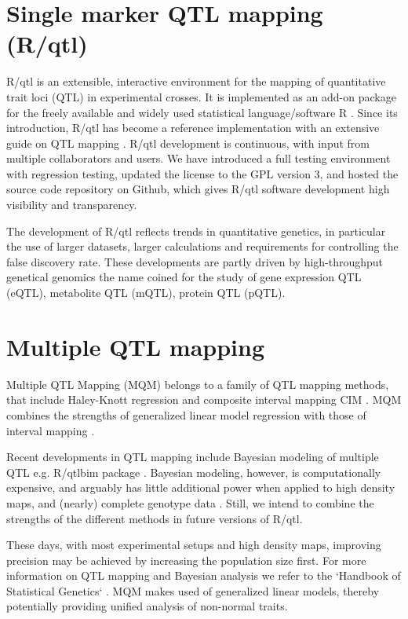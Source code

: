 \section{Single marker QTL mapping (R/qtl)}
R/qtl is an extensible, interactive environment for the mapping of quantitative trait loci (QTL) 
in experimental crosses. It is implemented as an add-on package for the freely available and 
widely used statistical language/software R \cite{R:2009}. Since its introduction, R/qtl 
\cite{Broman:2003} has become a reference implementation with an extensive guide on QTL mapping 
\cite{RQTLGuide:2009}. R/qtl development is continuous, with input from multiple collaborators 
and users.  We have introduced a full testing environment with regression testing, updated the 
license to the GPL version 3, and hosted the source code repository on Github, which gives R/qtl 
software development high visibility and transparency. 

The development of R/qtl reflects trends in quantitative genetics, in particular the use of 
larger datasets, larger calculations and requirements for controlling the false discovery rate. 
These developments are partly driven by high-throughput genetical genomics the name coined 
for the study of gene expression QTL (eQTL)\cite{Jansen:2001a}, metabolite QTL (mQTL), protein 
QTL (pQTL).

\section{Multiple QTL mapping}
\label{sect:mqm}
Multiple QTL Mapping (MQM) belongs to a family of QTL mapping methods, that include Haley-Knott 
regression \cite{Haley:1992} and composite interval mapping CIM \cite{Zeng:1994}. MQM combines 
the strengths of generalized linear model regression with those of interval mapping 
\cite{Jansen:1993, Jansen:1994b}. 

Recent developments in QTL mapping include Bayesian modeling of multiple QTL e.g. R/qtlbim 
package \cite{Yandell:2007, Banerjee:2008}. Bayesian modeling, however, is computationally 
expensive, and arguably has little additional power when applied to high density maps, and 
(nearly) complete genotype data \cite{Handbook:Jansen:2007}. Still, we intend to combine the 
strengths of the different methods in future versions of R/qtl.

These days, with most experimental setups and high density maps, improving precision may be 
achieved by increasing the population size first. For more information on QTL mapping and 
Bayesian analysis we refer to the `Handbook of Statistical Genetics` \cite{Handbook:2007}. MQM 
makes used of generalized linear models, thereby potentially providing unified analysis of 
non-normal traits.

